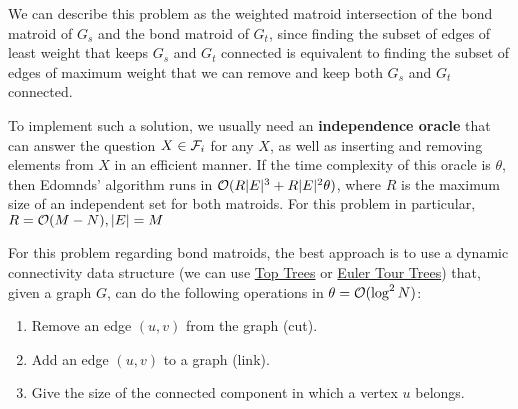 \documentclass[english,12pt]{article}
\begin{document}
        We can describe this problem as the weighted matroid intersection of the bond matroid of $G_s$ and the bond matroid of $G_t$, since finding the subset of edges of least weight that keeps $G_s$ and $G_t$ connected is equivalent to finding the subset of edges of maximum weight that we can remove and keep both $G_s$ and $G_t$ connected.

        To implement such a solution, we usually need an \textbf{independence oracle} that can answer the question $X \in \mathcal{F}_i$ for any $X$, as well as inserting and removing elements from $X$ in an efficient manner.
        If the time complexity of this oracle is $\theta$, then Edomnds' algorithm runs in $\mathcal{O}(R|E|^3 + R|E|^2\theta)$, where $R$ is the maximum size of an independent set for both matroids.
        For this problem in particular, $R = \mathcal{O}(M - N), |E| = M$

        For this problem regarding bond matroids, the best approach is to use a dynamic connectivity data structure (we can use \href{https://codeforces.com/blog/entry/128556}{Top Trees} or \href{https://courses.csail.mit.edu/6.851/spring12/scribe/L20.pdf}{Euler Tour Trees}) that, given a graph $G$, can do the following operations in $\theta = \mathcal{O}(\log^2 N)$:
        \begin{enumerate}
            \item Remove an edge $(u, v)$ from the graph (cut).
            \item Add an edge $(u, v)$ to a graph (link).
            \item Give the size of the connected component in which a vertex $u$ belongs.
        \end{enumerate}
\end{document}
